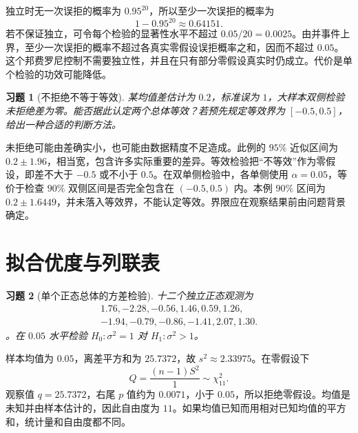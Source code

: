 \documentclass[UTF8,12pt,a4paper,fontset=fandol]{ctexart}
\newtheorem{exercise}{习题}[section]
\begin{document}
\begin{solve}\label{a:B14.3}独立时无一次误拒的概率为 $0.95^{20}$，所以至少一次误拒的概率为\[1-0.95^{20}\approx0.64151.\]若不保证独立，可令每个检验的显著性水平不超过 $0.05/20=0.0025$。由并事件上界，至少一次误拒的概率不超过各真实零假设误拒概率之和，因而不超过 $0.05$。这个邦费罗尼控制不需要独立性，并且在只有部分零假设真实时仍成立。代价是单个检验的功效可能降低。\end{solve}

\begin{exercise}[不拒绝不等于等效]\label{q:B14.4}
某均值差估计为 $0.2$，标准误为 $1$，大样本双侧检验未拒绝差为零。能否据此认定两个总体等效？若预先规定等效界为 $[-0.5,0.5]$，给出一种合适的判断方法。\par{}
\end{exercise}

\begin{solve}\label{a:B14.4}未拒绝可能由差确实小，也可能由数据精度不足造成。此例的 $95\%$ 近似区间为 $0.2\pm1.96$，相当宽，包含许多实际重要的差异。等效检验把“不等效”作为零假设，即差不大于 $-0.5$ 或不小于 $0.5$。在双单侧检验中，各单侧使用 $\alpha=0.05$，等价于检查 $90\%$ 双侧区间是否完全包含在 $(-0.5,0.5)$ 内。本例 $90\%$ 区间为 $0.2\pm1.6449$，并未落入等效界，不能认定等效。界限应在观察结果前由问题背景确定。\end{solve}

\clearpage\section{拟合优度与列联表}

\begin{exercise}[单个正态总体的方差检验]\label{q:M-P9-3}
十二个独立正态观测为 \[\begin{gathered}1.76,-2.28,-0.56,1.46,0.59,1.26,\\-1.94,-0.79,-0.86,-1.41,2.07,1.30.\end{gathered}\]。在 $0.05$ 水平检验 $H_0:\sigma^2=1$ 对 $H_1:\sigma^2>1$。\par{}
\end{exercise}

\begin{solve}\label{a:M-P9-3}样本均值为 $0.05$，离差平方和为 $25.7372$，故 $s^2\approx2.33975$。在零假设下\[Q=\frac{(n-1)S^2}{1}\sim\chi^2_{11}.\]观察值 $q=25.7372$，右尾 $p$ 值约为 $0.0071$，小于 $0.05$，所以拒绝零假设。均值是未知并由样本估计的，因此自由度为 $11$。如果均值已知而用相对已知均值的平方和，统计量和自由度都不同。\end{solve}
\end{document}
